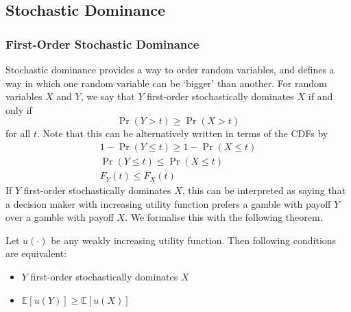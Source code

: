 \documentclass[11pt]{report} %
\begin{document}
\subsection{Stochastic Dominance}

\subsubsection{First-Order Stochastic Dominance}

Stochastic dominance provides a way to order random variables, and defines a way in which one random variable can be `bigger' than another. For random variables $X$ and $Y$, we say that $Y$ first-order stochastically dominates $X$ if and only if
\begin{equation}
\operatorname{Pr}\left(Y > t\right) \geq \operatorname{Pr}\left(X > t\right)
\end{equation}
for all $t$. Note that this can be alternatively written in terms of the CDFs by
\begin{gather}
1 - \operatorname{Pr}\left(Y \leq t\right) \geq 1 - \operatorname{Pr}\left(X \leq t\right) \\
\operatorname{Pr}\left(Y \leq t\right) \leq \operatorname{Pr}\left(X \leq t\right) \\
F_{Y}\left(t\right) \leq F_{X}\left(t\right)
\end{gather}
If $Y$ first-order stochastically dominates $X$, this can be interpreted as saying that a decision maker with increasing utility function prefers a gamble with payoff $Y$ over a gamble with payoff $X$. We formalise this with the following theorem.
\begin{theorem}
Let $u\left(\cdot\right)$ be any weakly increasing utility function. Then following conditions are equivalent:
\begin{itemize}
\item $Y$ first-order stochastically dominates $X$
\item $\mathbb{E}\left[u\left(Y\right)\right] \geq \mathbb{E}\left[u\left(X\right)\right]$
\end{itemize}
\end{theorem}
\end{document}

